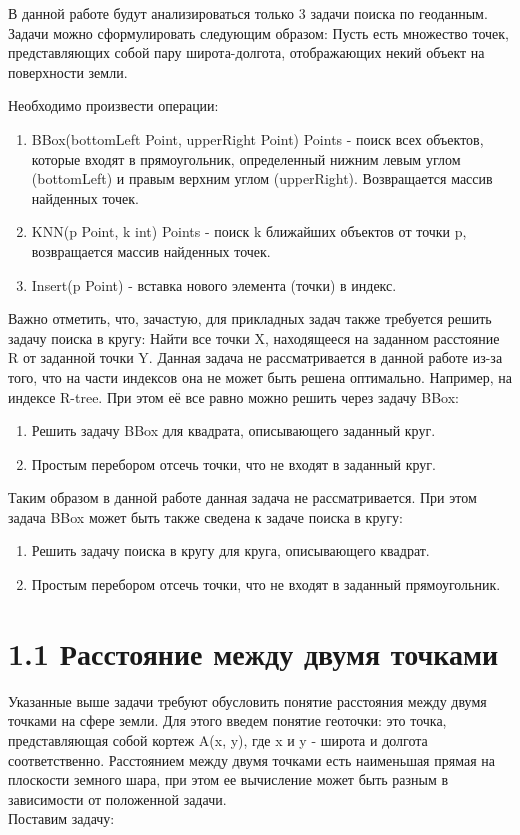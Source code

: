 \label{cha:analysis}

В данной работе будут анализироваться только 3 задачи поиска по геоданным. Задачи можно сформулировать следующим образом:
Пусть есть множество точек, представляющих собой пару широта-долгота, отображающих некий объект на поверхности земли. 

Необходимо произвести операции:  
\begin{enumerate}
    \item  BBox(bottomLeft Point, upperRight Point) Points - поиск всех объектов, которые входят в прямоугольник, определенный нижним левым углом (bottomLeft) и правым верхним углом (upperRight). Возвращается массив найденных точек.
    \item  KNN(p Point, k int) Points - поиск k ближайших объектов от точки p, возвращается массив найденных точек.
    \item  Insert(p Point) - вставка нового элемента (точки) в индекс. 
\end{enumerate}
Важно отметить, что, зачастую, для прикладных задач также требуется решить задачу поиска в кругу: Найти все точки X, находящееся на заданном расстояние R от заданной точки Y. Данная задача не рассматривается в данной работе из-за того, что на части индексов она не может быть решена оптимально. Например, на индексе R-tree. При этом её все равно можно решить через задачу BBox: 
\begin{enumerate}
    \item Решить задачу BBox для квадрата, описывающего заданный круг. 
    \item Простым перебором отсечь точки, что не входят в заданный круг.
\end{enumerate}
Таким образом в данной работе данная задача не рассматривается. При этом задача BBox может быть также сведена к задаче поиска в кругу:
\begin{enumerate}
    \item Решить задачу поиска в кругу для круга, описывающего квадрат.
    \item Простым перебором отсечь точки, что не входят в заданный прямоугольник.
\end{enumerate}

\section{1.1 Расстояние между двумя точками}
Указанные выше задачи требуют обусловить понятие расстояния между двумя точками на сфере земли. Для этого введем понятие геоточки: это точка, представляющая собой кортеж A(x, y), где x и y - широта и долгота соответственно. 
Расстоянием между двумя точками есть наименьшая прямая на плоскости земного шара, при этом ее вычисление может быть разным в зависимости от положенной задачи. \\
Поставим задачу:

